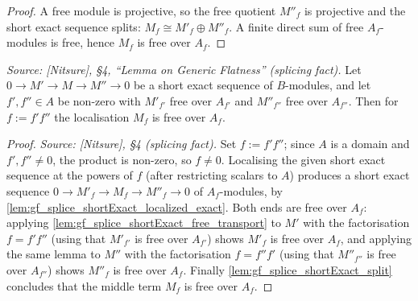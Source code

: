 \begin{proof}


\leanok
  A free module is projective, so the free quotient \(M''_f\) is projective and the
  short exact sequence splits: \(M_f \cong M'_f \oplus M''_f\). A finite direct sum
  of free \(A_f\)-modules is free, hence \(M_f\) is free over \(A_f\).
\end{proof}

\begin{lemma}
  \label{lem:gf_splice_shortExact}
  \textit{Source: [Nitsure], \S4, ``Lemma on Generic Flatness'' (splicing fact).}
  Let \(0 \to M' \to M \to M'' \to 0\) be a short exact sequence of \(B\)-modules,
  and let \(f', f'' \in A\) be non-zero with \(M'_{f'}\) free over \(A_{f'}\) and
  \(M''_{f''}\) free over \(A_{f''}\). Then for \(f := f' f''\) the localisation
  \(M_f\) is free over \(A_f\).
\end{lemma}

\begin{proof}
        \leanok
  \textit{Source: [Nitsure], \S4 (splicing fact).}
  Set \(f := f' f''\); since \(A\) is a domain and \(f', f'' \ne 0\), the product is
  non-zero, so \(f \ne 0\). Localising the given short exact sequence at the powers
  of \(f\) (after restricting scalars to \(A\)) produces a short exact sequence
  \(0 \to M'_f \to M_f \to M''_f \to 0\) of \(A_f\)-modules, by
  \cref{lem:gf_splice_shortExact_localized_exact}. Both ends are free over \(A_f\):
  applying \cref{lem:gf_splice_shortExact_free_transport} to \(M'\) with the
  factorisation \(f = f' f''\) (using that \(M'_{f'}\) is free over \(A_{f'}\)) shows
  \(M'_f\) is free over \(A_f\), and applying the same lemma to \(M''\) with the
  factorisation \(f = f'' f'\) (using that \(M''_{f''}\) is free over \(A_{f''}\))
  shows \(M''_f\) is free over \(A_f\). Finally
  \cref{lem:gf_splice_shortExact_split} concludes that the middle term \(M_f\) is
  free over \(A_f\).
\end{proof}

